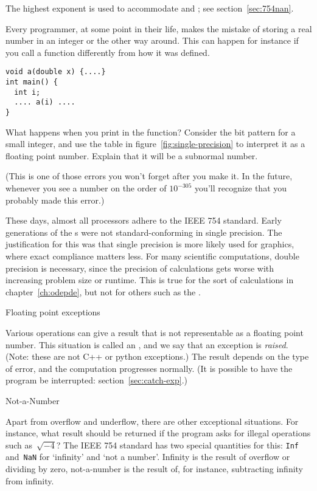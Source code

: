 The highest exponent is used to accommodate  and ;
see section~\ref{sec:754nan}.

\begin{exercise}
  Every programmer, at some point in their life, makes the mistake of
  storing a real number in an integer or the other way around. This
  can happen for instance if you call a function differently from how
  it was defined.
\begin{verbatim}
void a(double x) {....}
int main() {
  int i;
  .... a(i) ....
}
\end{verbatim}
What happens when you print  in the function? Consider the bit
pattern for a small integer, and use the table in
figure~\ref{fig:single-precision} to interpret it as a floating point
number. Explain that it will be a subnormal number.

(This
  is one of those errors you won't forget after you make it. In the
  future, whenever you see a number on the order of $10^{-305}$ you'll
  recognize that you probably made this error.)
\end{exercise}

These days, almost all processors adhere to the IEEE 754 standard.
Early generations of the 
s were not standard-conforming in single precision.
The justification
for this was that single precision is more likely used for graphics,
where exact compliance matters less. For many scientific computations,
double precision is necessary, since the precision of calculations
gets worse with increasing problem size or runtime. This is true for
the sort of calculations in chapter~\ref{ch:odepde}, but not for
others such as the .

 {Floating point exceptions}

Various operations can give a result that is not representable as a
floating point number. This situation is called an ,
and we say that an exception is \emph{raised}.
(Note: these are not C++ or python exceptions.)
The result depends on the type of error, and the computation
progresses normally. (It is possible to have the program
be interrupted: section~\ref{sec:catch-exp}.)

 {Not-a-Number}
\label{sec:754nan}

Apart from overflow and underflow, there are other
exceptional situations.
For instance,
what result should be returned if the program asks for
illegal operations such as~$\sqrt{-4}$? The IEEE 754 standard has two
special quantities for this: \texttt{Inf} and~\texttt{NaN} for
`infinity' and `not a number'.  Infinity is the result of overflow or
dividing by zero, not-a-number is the result of, for instance,
subtracting infinity from infinity.  

